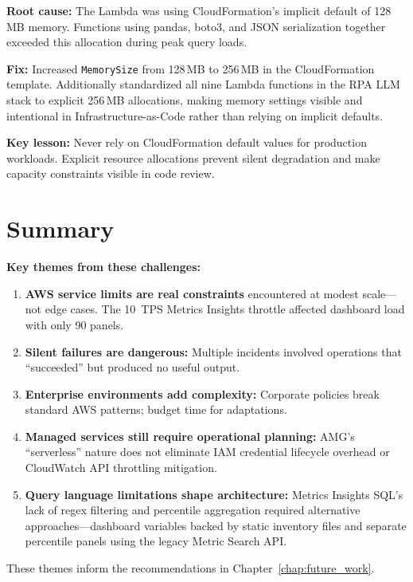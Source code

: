 \textbf{Root cause:} 
The Lambda was using CloudFormation's implicit default
of 128\,MB memory. Functions using pandas, boto3, and JSON serialization
together exceeded this allocation during peak query loads.

\textbf{Fix:} 
Increased \texttt{MemorySize} from 128\,MB to 256\,MB in the
CloudFormation template. Additionally standardized all nine Lambda functions
in the RPA LLM stack to explicit 256\,MB allocations, making memory settings
visible and intentional in Infrastructure-as-Code rather than relying on
implicit defaults.

\textbf{Key lesson:} 
Never rely on CloudFormation default values for
production workloads. Explicit resource allocations prevent silent
degradation and make capacity constraints visible in code review.


\FloatBarrier

\section{Summary}
\label{sec:challenges-summary}


\textbf{Key themes from these challenges:}

\begin{enumerate}
    \item \textbf{AWS service limits are real constraints} encountered at modest
          scale---not edge cases. The 10~TPS Metrics Insights throttle affected
          dashboard load with only 90 panels.

    \item \textbf{Silent failures are dangerous:} Multiple incidents involved
          operations that ``succeeded'' but produced no useful output.

    \item \textbf{Enterprise environments add complexity:} Corporate policies
          break standard AWS patterns; budget time for adaptations.

    \item \textbf{Managed services still require operational planning:} AMG's
          ``serverless'' nature does not eliminate IAM credential lifecycle
          overhead or CloudWatch API throttling mitigation.

    \item \textbf{Query language limitations shape architecture:} Metrics
          Insights SQL's lack of regex filtering and percentile aggregation
          required alternative approaches---dashboard variables backed by
          static inventory files and separate percentile panels using the
          legacy Metric Search API.
\end{enumerate}

These themes inform the recommendations in Chapter~\ref{chap:future_work}.

\FloatBarrier
